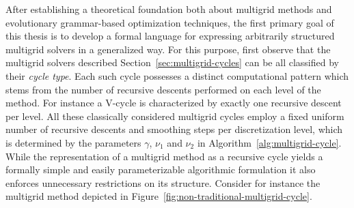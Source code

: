 After establishing a theoretical foundation both about multigrid methods and evolutionary grammar-based optimization techniques, the first primary goal of this thesis is to develop a formal language for expressing arbitrarily structured multigrid solvers in a generalized way.
For this purpose, first observe that the multigrid solvers described Section~\ref{sec:multigrid-cycles} can be all classified by their \emph{cycle type}.
Each such cycle possesses a distinct computational pattern which stems from the number of recursive descents performed on each level of the method.
For instance a V-cycle is characterized by exactly one recursive descent per level.
All these classically considered multigrid cycles employ a fixed uniform number of recursive descents and smoothing steps per discretization level, which is determined by the parameters $\gamma$, $\nu_1$ and $\nu_2$ in Algorithm~\ref{alg:multigrid-cycle}.
While the representation of a multigrid method as a recursive cycle yields a formally simple and easily parameterizable algorithmic formulation it also enforces unnecessary restrictions on its structure.
Consider for instance the multigrid method depicted in Figure~\ref{fig:non-traditional-multigrid-cycle}.
